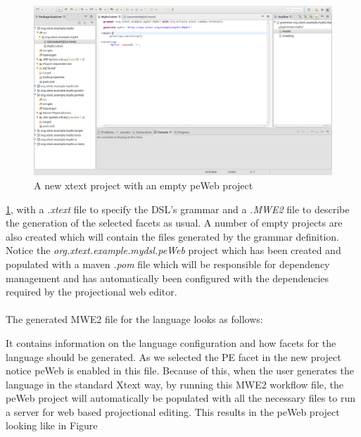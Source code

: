 \documentclass{article}
\begin{document}
\begin{figure}[h!]
  \includegraphics[width=\linewidth]{./Screenshots/newProjectScreen.png}
  \caption{A new xtext project with an empty peWeb project}
  \label{fig:newProjectScreen}
\end{figure} \ref{fig:newProjectScreen}, with a \emph{.xtext} file to specify the DSL's grammar and a \emph{.MWE2} file to describe the generation of the selected facets as usual. A number of empty projects are also created which will contain the files generated by the grammar definition. Notice the \emph{org.xtext.example.mydsl.peWeb} project which has been created and populated with a maven \emph{.pom} file which will be responsible for dependency management and has automatically been configured with the dependencies required by the projectional web editor. 
\\
\\
The generated MWE2 file for the language looks as follows:

It contains information on the language configuration and how facets for the language should be generated. As we selected the PE facet in the new project notice peWeb is enabled in this file. Because of this, when the user generates the language in the standard Xtext way, by running this MWE2 workflow file, the peWeb project will automatically be populated with all the necessary files to run a server for web based projectional editing. This results in the peWeb project looking like in Figure 
\end{document}
